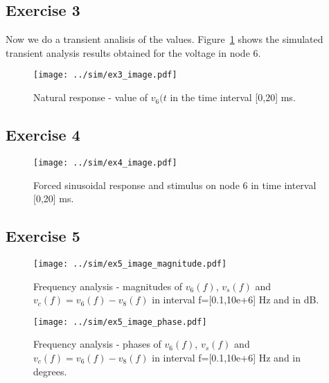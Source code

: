 \subsection{Exercise 3}

Now we do a transient analisis of the values. Figure~\ref{fig:Ex3_Image} shows the simulated transient analysis results obtained for the voltage in node 6.

\begin{figure}[H]
  \centering
  \texttt{[image: ../sim/ex3\_image.pdf]}
  \caption{Natural response - value of $v_6(t$ in the time interval [0,20] ms.}
  \label{fig:Ex3_Image}
\end{figure}

\subsection{Exercise 4}

\begin{figure}[H]
  \centering
  \texttt{[image: ../sim/ex4\_image.pdf]}
  \caption{Forced sinusoidal response and stimulus on node 6 in time interval [0,20] ms.}
  \label{fig:Ex4_Image}
\end{figure}

\subsection{Exercise 5}

\begin{figure}[H]
  \centering
  \texttt{[image: ../sim/ex5\_image\_magnitude.pdf]}
  \caption{Frequency analysis - magnitudes of $v_6(f)$, $v_s(f)$ and $v_c(f)=v_6(f)-v_8(f)$ in interval f=[0.1,10e+6] Hz and in dB.}
  \label{fig:Ex5_Image_Magnitude}
\end{figure}

\begin{figure}[H]
  \centering
  \texttt{[image: ../sim/ex5\_image\_phase.pdf]}
  \caption{Frequency analysis - phases of $v_6(f)$, $v_s(f)$ and $v_c(f)=v_6(f)-v_8(f)$ in interval f=[0.1,10e+6] Hz and in degrees.}
  \label{fig:Ex5_Image_Phase}
\end{figure}
